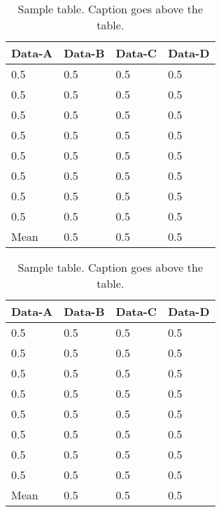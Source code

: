 \documentclass[master]{thesis}
\begin{document}
\begin{table*}[hp]
    \caption{Sample table.  Caption goes above the table.}
    \label{table:sample}
    \begin{center}
        \begin{tabular}{@{}*{4}{l}} %
            \toprule
            Data-A  & Data-B    & Data-C    & Data-D \\
            \midrule
            0.5     & 0.5       & 0.5       & 0.5   \\
            0.5     & 0.5       & 0.5       & 0.5   \\
            0.5     & 0.5       & 0.5       & 0.5   \\
            0.5     & 0.5       & 0.5       & 0.5   \\
            0.5     & 0.5       & 0.5       & 0.5   \\
            0.5     & 0.5       & 0.5       & 0.5   \\
            0.5     & 0.5       & 0.5       & 0.5   \\
            0.5     & 0.5       & 0.5       & 0.5   \\
            \midrule
            Mean    & 0.5       & 0.5       & 0.5   \\
            \bottomrule
        \end{tabular}
    \end{center}
\end{table*}
\begin{table*}[hp]
    \caption{Sample table.  Caption goes above the table.}
    \label{table:sample}
    \begin{center}
        \begin{tabular}{@{}*{4}{l}} %
            \toprule
            Data-A  & Data-B    & Data-C    & Data-D \\
            \midrule
            0.5     & 0.5       & 0.5       & 0.5   \\
            0.5     & 0.5       & 0.5       & 0.5   \\
            0.5     & 0.5       & 0.5       & 0.5   \\
            0.5     & 0.5       & 0.5       & 0.5   \\
            0.5     & 0.5       & 0.5       & 0.5   \\
            0.5     & 0.5       & 0.5       & 0.5   \\
            0.5     & 0.5       & 0.5       & 0.5   \\
            0.5     & 0.5       & 0.5       & 0.5   \\
            \midrule
            Mean    & 0.5       & 0.5       & 0.5   \\
            \bottomrule
        \end{tabular}
    \end{center}
\end{table*}
\end{document}
